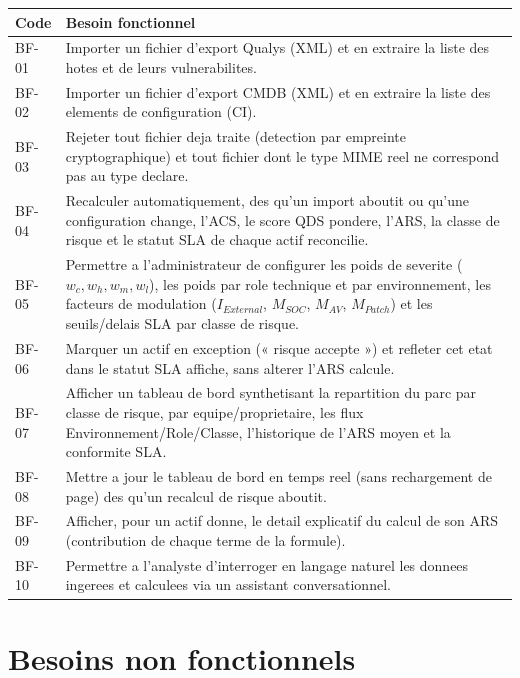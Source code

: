 \begin{longtable}{@{}p{1.3cm}p{11.5cm}@{}}
\toprule
\textbf{Code} & \textbf{Besoin fonctionnel} \\
\midrule
\endhead
BF-01 & Importer un fichier d'export Qualys (XML) et en extraire la liste des hotes
et de leurs vulnerabilites. \\
BF-02 & Importer un fichier d'export CMDB (XML) et en extraire la liste des elements
de configuration (CI). \\
BF-03 & Rejeter tout fichier deja traite (detection par empreinte cryptographique) et
tout fichier dont le type MIME reel ne correspond pas au type declare. \\
BF-04 & Recalculer automatiquement, des qu'un import aboutit ou qu'une configuration
change, l'ACS, le score QDS pondere, l'ARS, la classe de risque et le statut SLA de
chaque actif reconcilie. \\
BF-05 & Permettre a l'administrateur de configurer les poids de severite
($w_c, w_h, w_m, w_l$), les poids par role technique et par environnement, les
facteurs de modulation ($I_{External}$, $M_{SOC}$, $M_{AV}$, $M_{Patch}$) et les
seuils/delais SLA par classe de risque. \\
BF-06 & Marquer un actif en exception (« risque accepte ») et refleter cet etat dans
le statut SLA affiche, sans alterer l'ARS calcule. \\
BF-07 & Afficher un tableau de bord synthetisant la repartition du parc par classe de
risque, par equipe/proprietaire, les flux Environnement/Role/Classe, l'historique de
l'ARS moyen et la conformite SLA. \\
BF-08 & Mettre a jour le tableau de bord en temps reel (sans rechargement de page)
des qu'un recalcul de risque aboutit. \\
BF-09 & Afficher, pour un actif donne, le detail explicatif du calcul de son ARS
(contribution de chaque terme de la formule). \\
BF-10 & Permettre a l'analyste d'interroger en langage naturel les donnees ingerees
et calculees via un assistant conversationnel. \\
\bottomrule
\end{longtable}

\section{Besoins non fonctionnels}

